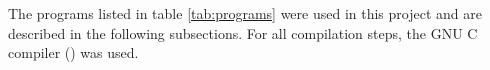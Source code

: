 \label{sec:programs}
The programs listed in table \ref{tab:programs} were used in this project and
are described in the following subsections. For all compilation steps, the GNU C
compiler () was used.



